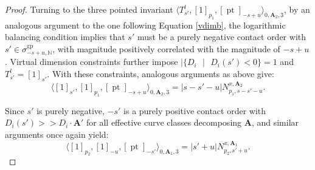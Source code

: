 \documentclass[12pt, oneside]{amsart}   	%
\newcounter{thm}
\newcommand{\NN}{\mathbb{N}}
\newcommand{\pt}{\operatorname{pt}}
\newcommand{\ev}{\operatorname{ev}}
\newcommand{\gp}{\operatorname{gp}}
\numberwithin{equation}{section}
\numberwithin{thm}{section}
\numberwithin{figure}{section}
\begin{document}
\begin{proof}


Turning to the three pointed invariant $\langle T_{s'}^l,[1]_{p_1},[\pt]_{-s+u}\rangle_{0,\textbf{A}_2,3}$, by an analogous argument to the one following Equation \ref{vdimb}, the logarithmic balancing condition implies that $s'$ must be a purely negative contact order with $s' \in \sigma_{-s+u,\NN}^{\gp}$, with magnitude positively correlated with the magnitude of $-s+u$. Virtual dimension constraints further impose $|\{D_i\text{ }|\text{ }D_i(s') < 0\} = 1$ and $T_{s'}^l = [1]_{s'}$. With these constraints, analogous arguments as above give:
 \begin{equation}
 \langle [1]_{s'},[1]_{p_1},[\pt]_{-s+u}\rangle_{0,\textbf{A}_2,3} = |s-s'-u|N_{p_1,s-s'-u}^{x,\textbf{A}_2}.
 \end{equation}
 
 Since $s'$ is purely negative, $-s'$ is a purely positive contact order with $D_i(s') >> D_i \cdot \textbf{A}'$ for all effective curve classes decomposing $\textbf{A}$, and similar arguments once again yield:
 \begin{equation}
 \langle[1]_{p_2},[1]_{-u},[\pt]_{-s'}\rangle_{0,\textbf{A}_1,3} = |s'+u|N_{p_2,s'+u}^{x,\textbf{A}_1}.
 \end{equation}
 

\end{proof}
\end{document}
